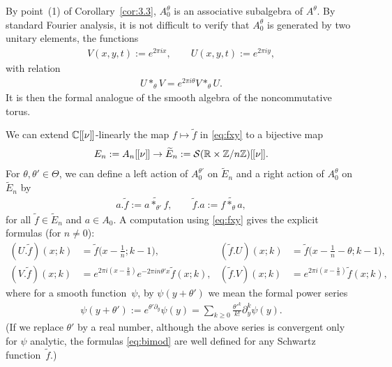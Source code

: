 \documentclass[pdftex]{sigma}
\numberwithin{equation}{section}
\theoremstyle{definition}
\newcommand{\R}{\mathbb{R}}
\newcommand{\C}{\mathbb{C}}
\newcommand{\Z}{\mathbb{Z}}
\newcommand{\mc}{\mathcal}
\newcommand{\lbrak}{[\hspace{-0.5pt}[}
\newcommand{\rbrak}{]\hspace{-0.5pt}]}
\renewcommand{\hbar}{\nu}
\begin{document}
By point~(1) of Corollary~\ref{cor:3.3}, $A_0^\theta$ is an associative subalgebra of $A^\theta$.
By standard Fourier analysis, it is not dif\/f\/icult to verify that $A^\theta_0$ is generated by two unitary elements, the functions
\begin{gather}\label{eq:VUtorus}
V(x,y,t):=e^{2\pi ix} ,\qquad
U(x,y,t):=e^{2\pi iy} ,
\end{gather}
with relation
\begin{gather}\label{eq:VstarU}
U\ast_\theta V=e^{2\pi i\theta} V\ast_\theta U .
\end{gather}
It is then the formal analogue of the smooth algebra of the noncommutative torus.

We can extend $\C\lbrak \hbar\rbrak $-linearly the map $f\mapsto\widetilde{f}$ in \eqref{eq:fxy} to a bijective map
\begin{gather*}
E_n:=A_n\lbrak\hbar\rbrak\to\widetilde{E}_n:=\mc{S}(\R\times\Z/n\Z)\lbrak\hbar\rbrak .
\end{gather*}
For $\theta,\theta'\in\Theta$,
we can def\/ine a left action of $A^{\theta'}_0$
on $\widetilde{E}_n$ and a right action of $A^\theta_0$ on $\widetilde{E}_n$ by
\begin{gather*}
a.\widetilde{f}:=\widetilde{a\ast_{\theta'}f} ,
\qquad
\widetilde{f}.a:=\widetilde{f\ast_\theta a} ,
\end{gather*}
for all $\widetilde{f}\in\widetilde{E}_n$ and $a\in A_0$.
A computation using
\eqref{eq:fxy} gives the explicit formulas (for $n\neq 0$):
\begin{subequations}\label{eq:bimod}
\begin{align}
(U.\widetilde{f})(x;k) &=\widetilde{f}\big(x-\tfrac{1}{n};k-1\big) ,&
(\widetilde{f}.U)(x;k) &=\widetilde{f}\big(x-\tfrac{1}{n}-\theta;k-1\big) , \\
(V.\widetilde{f})(x;k) &=e^{2\pi i(x-\frac{k}{n})}e^{-2\pi in\theta'x}\widetilde{f}(x;k) , &
(\widetilde{f}.V)(x;k) &=e^{2\pi i(x-\frac{k}{n})}\widetilde{f}(x;k) ,
\end{align}
\end{subequations}
where for a smooth function~$\psi$,
by $\psi(y+\theta')$ we mean the formal power series
\begin{gather*}
\psi(y+\theta'):=e^{\theta'\partial_y}\psi(y)=\sum_{k\geq 0}\tfrac{\theta'^k}{k!}\partial_y^k\psi(y) .
\end{gather*}
(If we replace $\theta'$ by a real number, although the above 	series is convergent only for $\psi$ analytic, the formulas \eqref{eq:bimod} are well def\/ined for any Schwartz function~$\widetilde{f}$.)
\end{document}
